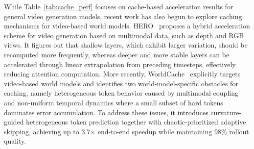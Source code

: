 \documentclass[lettersize,journal]{IEEEtran}
\begin{document}
While Table~\ref{tab:cache_perf} focuses on cache-based acceleration results for general video generation models, recent work has also begun to explore caching mechanisms for video-based world models. 
HERO~\cite{song2025hero} proposes a hybrid acceleration scheme for video generation based on multimodal data, such as depth and RGB views. It figures out that shallow layers, which exhibit larger variation, should be recomputed more frequently, whereas deeper and more stable layers can be accelerated through linear extrapolation from preceding timesteps, effectively reducing attention computation. 
More recently, WorldCache~\cite{feng2026worldcache} explicitly targets video-based world models and identifies two world-model-specific obstacles for caching, namely heterogeneous token behavior caused by multimodal coupling and non-uniform temporal dynamics where a small subset of hard tokens dominates error accumulation. To address these issues, it introduces curvature-guided heterogeneous token prediction together with chaotic-prioritized adaptive skipping, achieving up to 3.7$\times$ end-to-end speedup while maintaining 98\% rollout quality. 
\begin{table}[t]
\centering
\renewcommand{\arraystretch}{1.15}
\setlength{\tabcolsep}{4pt}
\caption{Compact comparison of representative cache-based acceleration methods under the unified 4 A800 GPU setting, reported by PreciseCache~\cite{wang2026precisecache}.}
\label{tab:cache_perf}
\end{table}
\end{document}
